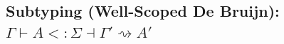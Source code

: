 \documentclass{article}
\begin{document}

\subsection{Subtyping (Well-Scoped De Bruijn): $\boxed{\Gamma \vdash A <: \Sigma \dashv \Gamma' \rightsquigarrow A'}$}
\end{document}
